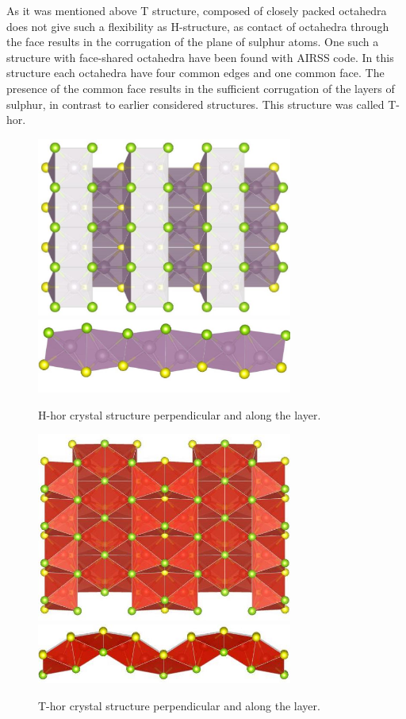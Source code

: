 \documentclass[a4paperm]{article}
\begin{document}
As it was mentioned above T structure, composed of closely packed octahedra does not give such a flexibility as H-structure, as contact of octahedra through the face results in the corrugation of the plane of sulphur atoms. 
One such a structure with face-shared octahedra have been found with AIRSS code.
In this structure each octahedra have four common edges and one common face.
The presence of the common face results in the sufficient corrugation of the layers of sulphur, in contrast to earlier considered structures.
This structure was called T-hor.

\begin{figure}[H]
	\includegraphics[width=0.75\textwidth]{H_hor_1.jpg} \\
	\includegraphics[width=0.75\textwidth]{H_hor_2.jpg}
	\caption{H-hor crystal structure perpendicular and along the layer.}
\label{H_hor}
\end{figure} 


\begin{figure}[H]
        \includegraphics[width=0.75\textwidth]{T_hor_1.jpg} \\
        \includegraphics[width=0.75\textwidth]{T_hor_2.jpg}
        \caption{T-hor crystal structure perpendicular and along the layer.}
\label{T_hor}
\end{figure}
\end{document}
